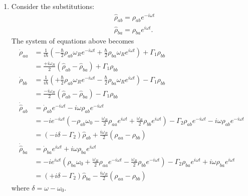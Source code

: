 \documentclass{article}
\theoremstyle{definition}
\newcommand{\f}[2]{\frac{#1}{#2}}
\newcommand{\lp}{\left(}
\newcommand{\rp}{\right)}
\begin{document}
\begin{enumerate}[label=(\alph*)]
	\begin{enumerate}[label=(\roman*)]
		\item Consider the substitutions:
		\begin{align*}
		&\hat{\rho}_{ab} = \rho_{ab} e^{-i\omega t} \\ 
		&\hat{\rho}_{ba} = \rho_{ba} e^{i\omega t}.
		\end{align*}
		The system of equations above becomes
		\begin{align*}
		\dot{\rho}_{aa} &= \f{1}{i\hbar}\lp -\f{\hbar}{2} \rho_{ab} \omega_R e^{-i\omega t} + \f{\hbar}{2} \rho_{ba}\omega_R e^{i\omega t } \rp + \Gamma_1 \rho_{bb}\\
		& = \f{+i\omega_R}{2} \lp \hat{\rho}_{ab} - \hat{\rho}_{ba} \rp + \Gamma_1 \rho_{bb}\\
		\dot{\rho}_{bb} &= \f{1}{i\hbar}\lp +\f{\hbar}{2} \rho_{ab} \omega_R e^{-i\omega t} - \f{\hbar}{2}\rho_{ba} \omega_R e^{i\omega t} \rp -\Gamma_1 \rho_{bb}\\
		& = \f{-i\omega_R}{2}\lp \hat{\rho}_{ab} - \hat{\rho}_{ba} \rp - \Gamma_1 \rho_{bb}\\
		\dot{\hat{\rho}}_{ab} &= \dot{\rho}_{ab}e^{-i\omega t} - i\omega \rho_{ab} e^{-i\omega t}\\
		& =  -ie^{-i\omega t}\lp - \rho_{ab} \omega_0 - \f{\omega_R}{2}\rho_{aa} e^{i\omega t} + \f{\omega_R}{2} \rho_{bb}  e^{i\omega t}  \rp -\Gamma_2 \rho_{ab}e^{-i\omega t} - i\omega \rho_{ab}e^{-i\omega t}\\
		&= (-i\delta - \Gamma_2)\hat{\rho}_{ab} + \f{i\omega_R}{2}(\rho_{aa} - \rho_{bb})\\
		\dot{\hat{\rho}}_{ba} &= \dot{\rho}_{ba} e^{i\omega t} + i\omega \rho_{ba} e^{i\omega t} \\
		&= -ie^{i\omega t}\lp \rho_{ba} \omega_0 + \f{\omega_R}{2}\rho_{aa} e^{-i\omega t} - \f{\omega_R}{2} \rho_{bb}  e^{-i\omega t}  \rp - \Gamma_2 \rho_{ba}e^{i\omega t} + i\omega \rho_{ba}e^{i\omega t}\\
		&= (+i\delta - \Gamma_2 ) \hat{\rho}_{ba} - \f{i\omega_R }{2} (\rho_{aa} - \rho_{bb})
		\end{align*}
		where $\delta = \omega - \omega_0$.
		
		
		
		
		

\end{enumerate}
\end{enumerate}
\end{document}
